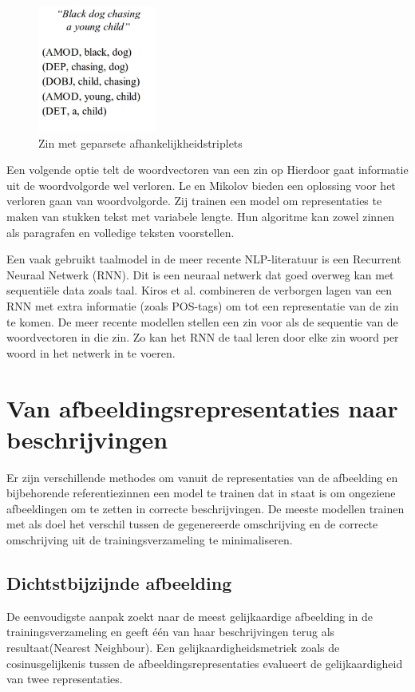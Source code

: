  \begin{figure}[tb]
     \centering
     \includegraphics[width=0.35\textwidth]{Images/dep_relations}
     \caption{Zin met geparsete afhankelijkheidstriplets\cite{Karpathy2014}}
     \label{fig:deprelations}
 \end{figure}

 Een volgende optie telt de woordvectoren van een zin op\cite{Lebret2013}  Hierdoor gaat informatie uit de woordvolgorde wel verloren. Le en Mikolov\cite{Le2014a} bieden een oplossing voor het verloren gaan van woordvolgorde. Zij trainen een model om representaties te maken van stukken tekst met variabele lengte. Hun algoritme kan zowel zinnen als paragrafen en volledige teksten voorstellen.

 Een vaak gebruikt taalmodel in de meer recente NLP-literatuur is een Recurrent Neuraal Netwerk (RNN)\cite{Mikolov2010}. Dit is een neuraal netwerk dat goed overweg kan met sequenti\"ele data zoals taal. Kiros et al.\cite{Kiros2013} combineren de verborgen lagen van een RNN met extra informatie (zoals POS-tags) om tot een representatie van de zin te komen. De meer recente modellen stellen een zin voor als de sequentie van de woordvectoren in die zin. Zo kan het RNN de taal leren door elke zin woord per woord in het netwerk in te voeren.
 
\section{Van afbeeldingsrepresentaties naar beschrijvingen}
Er zijn verschillende methodes om vanuit de representaties van de afbeelding en bijbehorende referentiezinnen een model te trainen dat in staat is om ongeziene afbeeldingen om te zetten in correcte beschrijvingen. 
De meeste modellen trainen met als doel het verschil tussen de gegenereerde omschrijving en de correcte omschrijving uit de trainingsverzameling te minimaliseren.

\subsection{Dichtstbijzijnde afbeelding}
De eenvoudigste aanpak zoekt naar de meest gelijkaardige afbeelding in de trainingsverzameling en geeft \'e\'en van haar beschrijvingen terug als resultaat(Nearest Neighbour)\cite{Devlin2015a}. Een gelijkaardigheidsmetriek zoals de cosinusgelijkenis tussen de afbeeldingsrepresentaties evalueert de gelijkaardigheid van twee representaties.

